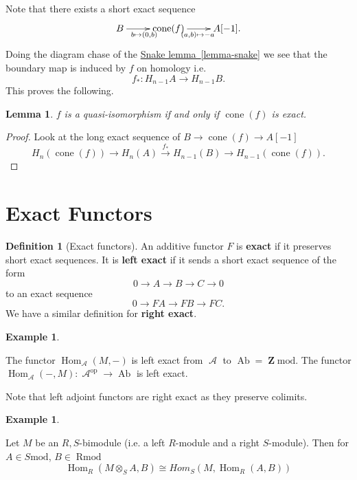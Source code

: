 \documentclass[10pt,]{book}
\newcommand{\terminology}[1]{\textbf{#1}}
\theoremstyle{plain}
\newtheorem{lemma}[theorem]{Lemma}
\theoremstyle{definition}
\newtheorem{definition}[theorem]{Definition}
\newtheorem{example}[theorem]{Example}
\numberwithin{equation}{section}
\DeclareMathOperator{\Hom}{Hom}
\DeclareMathOperator{\op}{op}
\DeclareMathOperator{\cone}{cone}
\DeclareMathOperator{\Ab}{\text{Ab}}
\DeclareMathOperator{\Rmod}{R\text{mod}}
\DeclareMathOperator{\cA}{\mathcal{A}}
\DeclareMathOperator{\ZZ}{\mathbf{Z}}
\begin{document}
          Note that there exists a short exact sequence
          \[
            \xymatrix{B \ar[r]_{b\mapsto (0,b)}& \cone(f) \ar[r]_{(a,b)\mapsto -a}& A[-1].}
          \]
          Doing the diagram chase of the \hyperref[lemma-snake]{Snake lemma~\ref*{lemma-snake}} we see that the boundary map is induced by \(f\) on homology i.e. \[f_*\colon H_{n-1}A \to H_{n-1}B.\]
          This proves the following.
\begin{lemma}\label{lemma-3}
\(f\) is a quasi-isomorphism if and only if \(\cone(f)\) is exact.\end{lemma}
\begin{proof}

            Look at the long exact sequence of \(B \to \cone(f) \to A[-1]\)\[
              H_{n}(\cone(f)) \to H_n(A) \xrightarrow{f_*} H_{n-1}(B) \to H_{n-1}(\cone(f)).
            \]\end{proof}
\typeout{************************************************}
\typeout{************************************************}
\section[Exact Functors]{Exact Functors}\label{sec-exact}
\begin{definition}[Exact functors]\label{definition-16}
An additive functor \(F\) is \terminology{exact} if it preserves short exact sequences.
            It is \terminology{left exact} if it sends a short exact sequence of the form
            \[
              0\to A \to B \to C \to 0
            \]
            to an exact sequence
            \[
              0 \to FA \to FB \to FC.
            \]
            We have a similar definition for \terminology{right exact}.
          \end{definition}
\begin{example}\label{example-7}

            The functor \(\Hom_{\cA}(M, -)\) is left exact from \(\cA\) to \(\Ab = \ZZ\text{mod}\).
            The functor \(\Hom_{\cA}( -, M)\colon \cA^{\op} \to\Ab\) is left exact.\newline{}\end{example}

          Note that left adjoint functors are right exact as they preserve colimits.
\begin{example}\label{example-8}

            Let \(M\) be an \(R,S\)-bimodule (i.e. a left \(R\)-module and a right \(S\)-module).
            Then for \(A \in S\text{mod}\), \(B\in \Rmod\)\[
              \Hom_{R}(M \otimes_S A, B) \cong Hom_{S}(M, \Hom_R(A,B))
            \]\end{example}
\par
\end{document}
